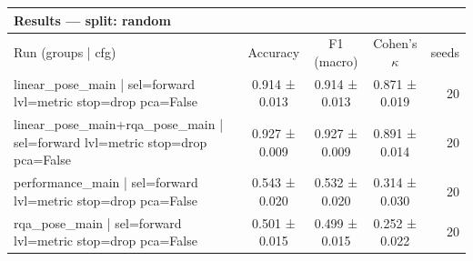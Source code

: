 \begin{tabular}{lccc r}
\toprule
\multicolumn{5}{l}{\textbf{Results — split: random}} \\
\midrule
Run (groups | cfg) & Accuracy & F1 (macro) & Cohen's $\kappa$ & seeds \\
\midrule
linear_pose_main | sel=forward lvl=metric stop=drop pca=False & 0.914 ± 0.013 & 0.914 ± 0.013 & 0.871 ± 0.019 & 20 \\
linear_pose_main+rqa_pose_main | sel=forward lvl=metric stop=drop pca=False & 0.927 ± 0.009 & 0.927 ± 0.009 & 0.891 ± 0.014 & 20 \\
performance_main | sel=forward lvl=metric stop=drop pca=False & 0.543 ± 0.020 & 0.532 ± 0.020 & 0.314 ± 0.030 & 20 \\
rqa_pose_main | sel=forward lvl=metric stop=drop pca=False & 0.501 ± 0.015 & 0.499 ± 0.015 & 0.252 ± 0.022 & 20 \\
\bottomrule
\end{tabular}